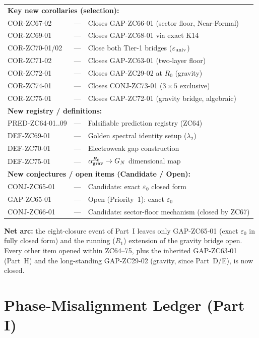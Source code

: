 \documentclass[12pt, a4paper]{article}
\begin{document}
\begin{keybox}[title={Status changes across the ZC64--75 arc}]
\begin{longtable}{@{}p{3.6cm}p{3.6cm}p{6.4cm}@{}}
\midrule
\multicolumn{3}{l}{\textbf{Key new corollaries (selection):}}\\
COR-ZC67-02 & --- & Closes GAP-ZC66-01 (sector floor, Near-Formal)\\
COR-ZC69-01 & --- & Closes GAP-ZC68-01 via exact K14\\
COR-ZC70-01/02 & --- & Close both Tier-1 bridges ($\varepsilon_{\rm univ}$)\\
COR-ZC71-02 & --- & Closes GAP-ZC63-01 (two-layer floor)\\
COR-ZC72-01 & --- & Closes GAP-ZC29-02 at $R_0$ (gravity)\\
COR-ZC74-01 & --- & Closes CONJ-ZC73-01 ($3\times5$ exclusive)\\
COR-ZC75-01 & --- & Closes GAP-ZC72-01 (gravity bridge, algebraic)\\
\midrule
\multicolumn{3}{l}{\textbf{New registry / definitions:}}\\
PRED-ZC64-01..09 & --- & Falsifiable prediction registry (ZC64)\\
DEF-ZC69-01 & --- & Golden spectral identity setup ($\lambda_2$)\\
DEF-ZC70-01 & --- & Electroweak gap construction\\
DEF-ZC75-01 & --- & $\alpha_{\rm grav}^{R_0}\to G_N$ dimensional map\\
\midrule
\multicolumn{3}{l}{\textbf{New conjectures / open items (Candidate / Open):}}\\
CONJ-ZC65-01 & --- & Candidate: exact $\varepsilon_0$ closed form\\
GAP-ZC65-01 & --- & Open (Priority~1): exact $\varepsilon_0$\\
CONJ-ZC66-01 & --- & Candidate: sector-floor mechanism (closed by ZC67)\\
\bottomrule
\end{longtable}
\end{keybox}

\noindent
\textbf{Net arc:} the eight-closure event of Part~I leaves only
GAP-ZC65-01 (exact $\varepsilon_0$ in fully closed form) and the
running ($R_1$) extension of the gravity bridge open. Every other item
opened within ZC64--75, plus the inherited GAP-ZC63-01 (Part~H) and the
long-standing GAP-ZC29-02 (gravity, since Part~D/E), is now closed.

\section{Phase-Misalignment Ledger (Part I)}
\label{sec:xlviii-pm}
\end{document}
